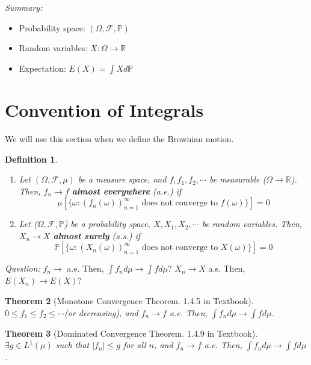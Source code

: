 \documentclass[12pt]{report}
\theoremstyle{break}
\newtheorem{thm}{Theorem}[section] %
\theoremstyle{newdef}
\newtheorem{defn}[thm]{Definition} %
\theoremstyle{remark}
\begin{document}
\textit{Summary:}
\begin{itemize}
\item Probability space: $(\Omega, \mathcal{F}, \mathbb{P})$
\item Random variables: $X: \Omega \rightarrow \mathbb{R}$
\item Expectation: $E(X) = \int Xd\mathbb{P}$
\end{itemize}





\section{Convention of Integrals}
We will use this section when we define the Brownian motion.
\begin{defn}
\leavevmode
\vspace{-6mm}
\begin{enumerate}[label = (\arabic*)]
\item
Let $(\Omega, \mathcal{F}, \mu)$ be a measure space, and
$f, f_1, f_2, \cdots$ be measurable ($\Omega \rightarrow \mathbb{R}$).
Then, $f_n \rightarrow f$ \textbf{almost everywhere} (a.e.) if
$$
\mu[\{\omega:(f_n(\omega))_{n=1}^\infty \text{ does not converge to } f(\omega)\}] = 0
$$

\item
Let ($\Omega, \mathcal{F}, \mathbb{P}$) be a probability space, $X, X_1, X_2, \cdots$ be random variables.
Then, $X_n \rightarrow X$ \textbf{almost surely} (a.s.) if
$$\mathbb{P}[\{\omega: (X_n(\omega))_{n=1}^\infty \text{ does not converge to } X(\omega)\}] = 0$$
\end{enumerate}
\end{defn}


\textit{Question:}
$f_n \rightarrow $ a.e. Then, $\int f_nd\mu \rightarrow \int fd\mu$?
$X_n \rightarrow X$ a.s. Then, $E(X_n) \rightarrow E(X)$?


\begin{thm}[Monotone Convergence Theorem. 1.4.5 in Textbook]
$0 \leq f_1 \leq f_2 \leq \cdots$(or decreasing), and $f_n \rightarrow f$ a.e.
Then, $\int f_nd\mu \rightarrow \int fd\mu$.
\end{thm}

\begin{thm}[Dominated Convergence Theorem. 1.4.9 in Textbook]
$\exists g \in L^1(\mu)$ such that $|f_n| \leq g$ for all $n$, and $f_n \rightarrow f$ a.e.
Then, $\int f_n d\mu \rightarrow \int f d\mu$.
\end{thm}
\end{document}
